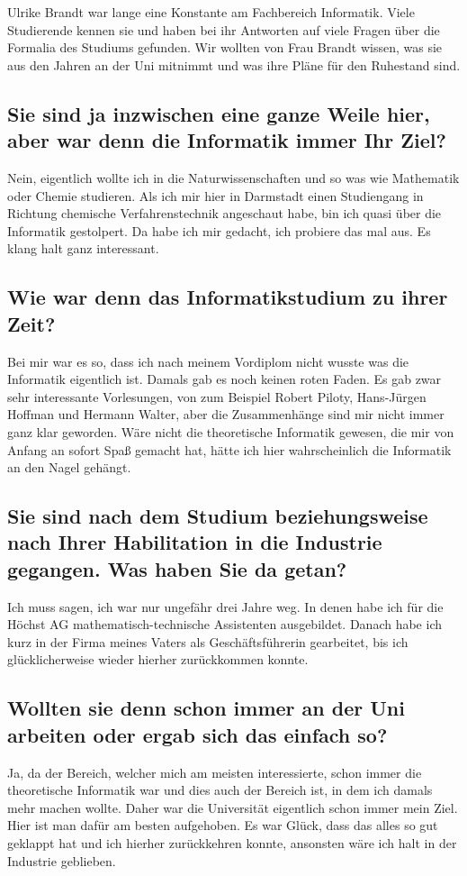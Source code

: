 {Ulrike Brandt war lange eine Konstante am Fachbereich Informatik. Viele Studierende kennen sie und haben bei ihr Antworten auf viele Fragen über die Formalia des Studiums gefunden. Wir wollten von Frau Brandt wissen, was sie aus den Jahren an der Uni mitnimmt und was ihre Pläne für den Ruhestand sind.
}
{
    \subsection*{Sie sind ja inzwischen eine ganze Weile hier, aber war denn die Informatik immer Ihr Ziel?}
    Nein, eigentlich wollte ich in die Naturwissenschaften und so was wie Mathematik oder Chemie studieren.
    Als ich mir hier in Darmstadt einen Studiengang in Richtung chemische Verfahrenstechnik angeschaut habe, bin ich quasi über die Informatik gestolpert. Da habe ich mir gedacht, ich probiere das mal aus. Es klang halt ganz interessant.
    \subsection*{Wie war denn das Informatikstudium zu ihrer Zeit?}
    Bei mir war es so, dass ich nach meinem Vordiplom nicht wusste was die Informatik eigentlich ist. Damals gab es noch keinen roten Faden. Es gab zwar sehr interessante Vorlesungen, von zum Beispiel Robert Piloty, Hans-Jürgen Hoffman und Hermann Walter, aber die Zusammenhänge sind mir nicht immer ganz klar geworden. Wäre nicht die theoretische Informatik gewesen, die mir von Anfang an sofort Spaß gemacht hat, hätte ich hier wahrscheinlich die Informatik an den Nagel gehängt.
    \subsection*{Sie sind nach dem Studium beziehungsweise nach Ihrer Habilitation in die Industrie gegangen. Was haben Sie da getan?}
    Ich muss sagen, ich war nur ungefähr drei Jahre weg. In denen habe ich für die Höchst AG mathematisch-technische Assistenten ausgebildet. Danach habe ich kurz in der Firma meines Vaters als Geschäftsführerin gearbeitet, bis ich glücklicherweise wieder hierher zurückkommen konnte.
    \subsection*{Wollten sie denn schon immer an der Uni arbeiten oder ergab sich das einfach so?}
    Ja, da der Bereich, welcher mich am meisten interessierte, schon immer die theoretische Informatik war und dies auch der Bereich ist, in dem ich damals mehr machen wollte. Daher war die Universität eigentlich schon immer mein Ziel. Hier ist man dafür am besten aufgehoben. Es war Glück, dass das alles so gut geklappt hat und ich hierher zurückkehren konnte, ansonsten wäre ich halt in der Industrie geblieben.
}
